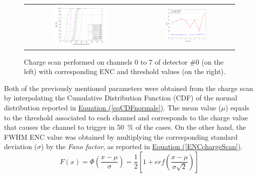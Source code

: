 \begin{figure}[h!] %
    \centering
    \begin{tabular}{cc}
        \includegraphics[width=0.505\textwidth]{Images/chap3/results/americio/Threshold Scan - Detector 0 - TH214.pdf} & \includegraphics[width=0.44\textwidth]{Images/chap3/results/americio/ENC_channels.pdf}\\
    \end{tabular}
    \caption{Charge scan performed on channels 0 to 7 of detector \#0 (on the left) with corresponding ENC and threshold values (on the right).}
    \label{figChargeScan}
\end{figure}

\par
Both of the previously mentioned parameters were obtained from the charge scan by interpolating the Cumulative Distribution Function (CDF) of the normal distribution reported in \hyperref[eqCDFnormale]{Equation (\ref{eqCDFnormale})}. The mean value ($\mu$) equals to the threshold associated to each channel and corresponds to the charge value that causes the channel to trigger in \SI{50}{\percent} of the cases. On the other hand, the FWHM ENC value was obtained by multiplying the corresponding standard deviation ($\sigma$) by the \textit{Fano factor}, as reported in \hyperref[ENCchargeScan]{Equation (\ref{ENCchargeScan})}. \\

\begin{equation}
    F(x) = \Phi \left(\frac{x-\mu}{\sigma}\right) = \frac{1}{2} \left[ 1 + erf \left( \frac{x-\mu}{\sigma \sqrt{2}} \right) \right]
    \label{eqCDFnormale}
\end{equation}

